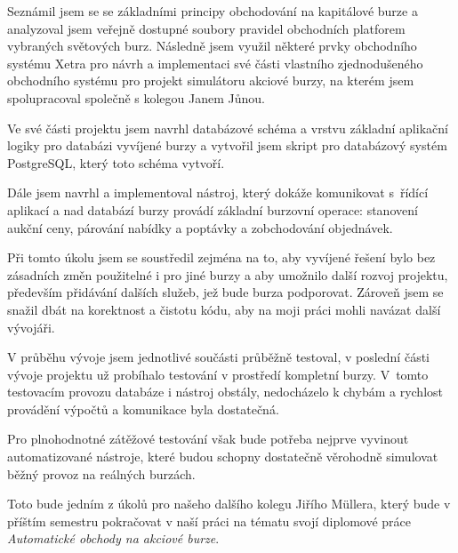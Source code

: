 \documentclass[thesis=M,czech]{FITthesis}[2012/06/26]
\begin{document}
\begin{conclusion}

Seznámil jsem se se základními principy obchodování na kapitálové burze a analyzoval jsem veřejně 
dostupné soubory pravidel obchodních platforem vybraných světových burz. Následně jsem využil 
některé prvky obchodního systému Xetra pro návrh a implementaci své části vlastního zjednodušeného 
obchodního systému pro projekt simulátoru akciové burzy, na kterém jsem spolupracoval společně 
s kolegou Janem Jůnou. 

Ve své části projektu jsem navrhl databázové schéma a vrstvu základní aplikační logiky pro databázi 
vyvíjené burzy a vytvořil jsem skript pro databázový systém PostgreSQL, který toto schéma vytvoří.

Dále jsem navrhl a implementoval nástroj, který dokáže komunikovat s~řídící aplikací a nad databází 
burzy provádí základní burzovní operace: stanovení aukční ceny, párování nabídky a poptávky a 
zobchodování objednávek.

Při tomto úkolu jsem se soustředil zejména na to, aby vyvíjené řešení bylo bez zásadních změn použitelné 
i pro jiné burzy a aby umožnilo další rozvoj projektu, především přidávání dalších služeb, jež bude burza 
podporovat. Zároveň jsem se snažil dbát na korektnost a čistotu kódu, aby na moji práci mohli navázat
další vývojáři.

V průběhu vývoje jsem jednotlivé součásti průběžně testoval, v poslední části vývoje projektu už 
probíhalo testování v prostředí kompletní burzy. V~tomto testovacím provozu databáze i nástroj 
obstály, nedocházelo k chybám a rychlost provádění výpočtů a komunikace byla dostatečná. 

Pro plnohodnotné zátěžové testování však bude potřeba nejprve vyvinout automatizované nástroje, 
které budou schopny dostatečně věrohodně simulovat běžný provoz na reálných burzách. 

Toto bude jedním z úkolů pro našeho dalšího kolegu Jiřího Müllera, který bude v příštím semestru 
pokračovat v naší práci na tématu svojí diplomové práce \textit{Automatické obchody na akciové burze}.



\end{conclusion}
\end{document}
